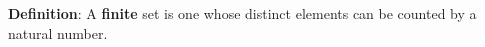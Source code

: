 
{\bf Definition}: A {\bf finite} set is one whose distinct elements can be counted by a natural number.
